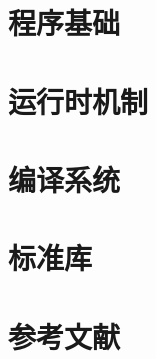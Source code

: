 \documentclass{ctexbook}
\begin{document}


\tableofcontents

\part{程序基础}


\part{运行时机制}




\part{编译系统}
\part{标准库}


\part*{参考文献}
\nocite{*}


\end{document}
